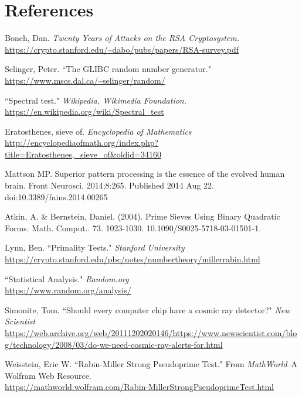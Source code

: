 \documentclass{article}
\begin{document}
\section{References}
\begin{thebibliography}{6}
Boneh, Dan. \textit{Twenty Years of Attacks on the RSA Cryptosystem.}
\\\url{https://crypto.stanford.edu/~dabo/pubs/papers/RSA-survey.pdf}

Selinger, Peter. ``The GLIBC random number generator."
\\\url{https://www.mscs.dal.ca/~selinger/random/}

``Spectral test." \textit{Wikipedia, Wikimedia Foundation.}
\\\url{https://en.wikipedia.org/wiki/Spectral_test}

Eratosthenes, sieve of.
\textit{Encyclopedia of Mathematics}\\
\url{http://encyclopediaofmath.org/index.php?title=Eratosthenes,_sieve_of&oldid=34160}

Mattson MP. Superior pattern processing is the essence of the evolved human brain. Front Neurosci. 2014;8:265. Published 2014 Aug 22. doi:10.3389/fnins.2014.00265

Atkin, A. \& Bernstein, Daniel. (2004). Prime Sieves Using Binary Quadratic Forms. Math. Comput.. 73. 1023-1030. 10.1090/S0025-5718-03-01501-1. 

Lynn, Ben. ``Primality Tests." \textit{Stanford University}
\\\url{https://crypto.stanford.edu/pbc/notes/numbertheory/millerrabin.html}

``Statistical Analysis." \textit{Random.org}
\\\url{https://www.random.org/analysis/}

Simonite, Tom. ``Should every computer chip have a cosmic ray detector?" \textit{New Scientist}
\\\url{https://web.archive.org/web/20111202020146/https://www.newscientist.com/blog/technology/2008/03/do-we-need-cosmic-ray-alerts-for.html}

Weisstein, Eric W. ``Rabin-Miller Strong Pseudoprime Test." From \textit{MathWorld}--A Wolfram Web Resource.
\\\url{https://mathworld.wolfram.com/Rabin-MillerStrongPseudoprimeTest.html}
\end{thebibliography}
         
\end{document}
